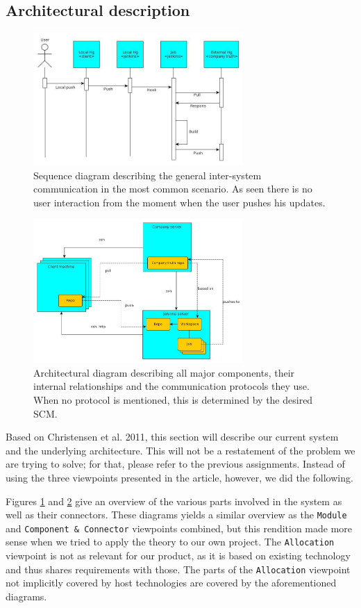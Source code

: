 \documentclass[a4paper]{article}
\begin{document}
\subsection{Architectural description}
\begin{figure}[!ht]
	\centering
	\includegraphics[width=8cm]{../graphs/sequence_diagram.jpg}
	\caption{Sequence diagram describing the general inter-system communication
	in the most common scenario. As seen there is no user interaction from the
	moment when the user pushes his updates.}
	\label{fig:dia_sequence}
\end{figure}
\begin{figure}[!ht]
	\centering
	\includegraphics[width=8cm]{../graphs/architecture_01.jpg}
	\caption{Architectural diagram describing all major components, their
	internal relationships and the communication protocols they use. When no
	protocol is mentioned, this is determined by the desired SCM.}
	\label{fig:dia_architecture}
\end{figure}

Based on Christensen et al. 2011, this section will describe our current
system and the underlying architecture. This will not be a restatement of the
problem we are trying to solve; for that, please refer to the previous assignments.
Instead of using the three viewpoints presented in the article, however, we did
the following.

Figures \ref{fig:dia_sequence} and \ref{fig:dia_architecture} give an overview of
the various parts involved in the system as well as their connectors. These
diagrams yields a similar overview as the \texttt{Module} and
\texttt{Component \& Connector} viewpoints combined, but this rendition made more
sense when we tried to apply the theory to our own project. The \texttt{Allocation}
viewpoint is not as relevant for our product, as it is based on existing technology
and thus shares requirements with those. The parts of the \texttt{Allocation} viewpoint
not implicitly covered by host technologies are covered by the aforementioned diagrams.
\end{document}
